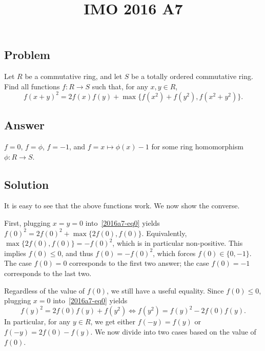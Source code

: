 \documentclass{article}
\title{IMO 2016 A7}
\author{}
\date{}
\begin{document}
\maketitle



\subsection*{Problem}

Let $R$ be a commutative ring, and let $S$ be a totally ordered commutative ring.
Find all functions $f : R \to S$ such that, for any $x, y \in R$,
\[ f(x + y)^2 = 2 f(x) f(y) + \max\{f(x^2) + f(y^2), f(x^2 + y^2)\}. \tag{*}\label{2016a7-eq0} \]



\subsection*{Answer}

$f = 0$, $f = \phi$, $f = -1$, and $f = x \mapsto \phi(x) - 1$ for some ring homomorphism $\phi : R \to S$.



\subsection*{Solution}

It is easy to see that the above functions work.
We now show the converse.

First, plugging $x = y = 0$ into~\eqref{2016a7-eq0} yields $f(0)^2 = 2f(0)^2 + \max\{2 f(0), f(0)\}$.
Equivalently, $\max\{2 f(0), f(0)\} = -f(0)^2$, which is in particular non-positive.
This implies $f(0) \leq 0$, and thus $f(0) = -f(0)^2$, which forces $f(0) \in \{0, -1\}$.
The case $f(0) = 0$ corresponds to the first two answer; the case $f(0) = -1$ corresponds to the last two.

Regardless of the value of $f(0)$, we still have a useful equality.
Since $f(0) \leq 0$, plugging $x = 0$ into~\eqref{2016a7-eq0} yields
\[ f(y)^2 = 2 f(0) f(y) + f(y^2) \iff f(y^2) = f(y)^2 - 2 f(0) f(y). \tag{1}\label{2016a7-eq1} \]
In particular, for any $y \in R$, we get either $f(-y) = f(y)$ or $f(-y) = 2 f(0) - f(y)$.
We now divide into two cases based on the value of $f(0)$.
\end{document}
